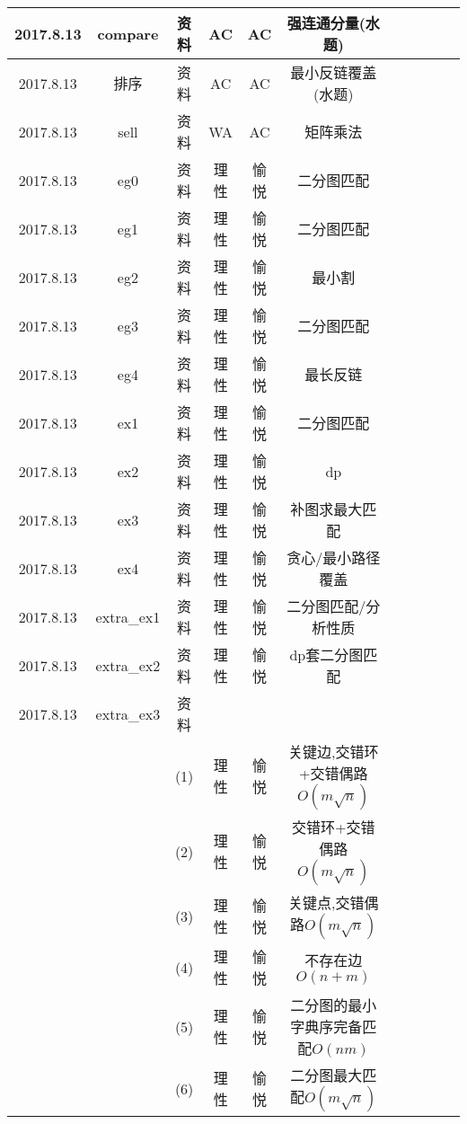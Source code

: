 \documentclass[landscape]{article}
\begin{document}
\begin{longtable}{ccccccccccc}
  \hline
  2017.8.13 & compare & 资料 & AC & AC & 强连通分量(水题)\\
  \hline
  2017.8.13 & 排序 & 资料 & AC & AC & 最小反链覆盖(水题)\\
  \hline
  2017.8.13 & sell & 资料 & WA & AC & 矩阵乘法\\
  \hline
  2017.8.13 & eg0 & 资料 & 理性 & 愉悦 & 二分图匹配\\
  \hline
  2017.8.13 & eg1 & 资料 & 理性 & 愉悦 & 二分图匹配\\
  \hline
  2017.8.13 & eg2 & 资料 & 理性 & 愉悦 & 最小割\\
  \hline
  2017.8.13 & eg3 & 资料 & 理性 & 愉悦 & 二分图匹配\\
  \hline
  2017.8.13 & eg4 & 资料 & 理性 & 愉悦 & 最长反链\\
  \hline
  2017.8.13 & ex1 & 资料 & 理性 & 愉悦 & 二分图匹配\\
  \hline
  2017.8.13 & ex2 & 资料 & 理性 & 愉悦 & dp\\
  \hline
  2017.8.13 & ex3 & 资料 & 理性 & 愉悦 & 补图求最大匹配\\
  \hline
  2017.8.13 & ex4 & 资料 & 理性 & 愉悦 & 贪心/最小路径覆盖\\
  \hline
  2017.8.13 & extra\_ex1 & 资料 & 理性 & 愉悦 & 二分图匹配/分析性质\\
  \hline
  2017.8.13 & extra\_ex2 & 资料 & 理性 & 愉悦 & dp套二分图匹配\\
  \hline
  2017.8.13 & extra\_ex3 & 资料\\

  & & (1) & 理性 & 愉悦 & 关键边,交错环+交错偶路$O(m\sqrt{n})$\\

  & & (2) & 理性 & 愉悦 & 交错环+交错偶路$O(m\sqrt{n})$\\

  & & (3) & 理性 & 愉悦 & 关键点,交错偶路$O(m\sqrt{n})$\\

  & & (4) & 理性 & 愉悦 & 不存在边$O(n+m)$\\

  & & (5) & 理性 & 愉悦 & 二分图的最小字典序完备匹配$O(nm)$\\

  & & (6) & 理性 & 愉悦 & 二分图最大匹配$O(m\sqrt{n})$\\


\end{longtable}
\end{document}
